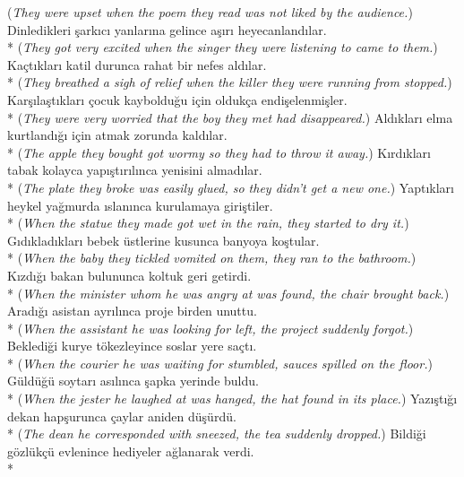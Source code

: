 ({\it They were upset when the poem they read was not liked by the audience.})
\ex Dinledikleri \c{s}ark{\i}c{\i} yanlar{\i}na gelince a\c{s}{\i}r{\i} heyecanland{\i}lar. \\*
({\it They got very excited when the singer they were listening to came to them.})
\ex Ka\c{c}t{\i}klar{\i} katil durunca rahat bir nefes ald{\i}lar. \\*
({\it They breathed a sigh of relief when the killer they were running from stopped.})
\ex Kar\c{s}{\i}la\c{s}t{\i}klar{\i} \c{c}ocuk kayboldu\u{g}u i\c{c}in olduk\c{c}a endi\c{s}elenmi\c{s}ler. \\*
({\it They were very worried that the boy they met had disappeared.})
\ex Ald{\i}klar{\i} elma kurtland{\i}\u{g}{\i} i\c{c}in atmak zorunda kald{\i}lar. \\*
({\it The apple they bought got wormy so they had to throw it away.})
\ex K{\i}rd{\i}klar{\i} tabak kolayca yap{\i}\c{s}t{\i}r{\i}l{\i}nca yenisini almad{\i}lar. \\*
({\it The plate they broke was easily glued, so they didn't get a new one.})
\ex Yapt{\i}klar{\i} heykel ya\u{g}murda {\i}slan{\i}nca kurulamaya giri\c{s}tiler. \\*
({\it When the statue they made got wet in the rain, they started to dry it.})
\ex G{\i}d{\i}klad{\i}klar{\i} bebek \"{u}stlerine kusunca banyoya ko\c{s}tular. \\*
({\it When the baby they tickled vomited on them, they ran to the bathroom.})
\z
{}
\ea * K{\i}zd{\i}\u{g}{\i} bakan bulununca koltuk geri getirdi. \\*
({\it * When the minister whom he was angry at was found, the chair brought back.})
\ex * Arad{\i}\u{g}{\i} asistan ayr{\i}l{\i}nca proje birden unuttu. \\*
({\it * When the assistant he was looking for left, the project suddenly forgot.})
\ex * Bekledi\u{g}i kurye t\"{o}kezleyince soslar yere sa\c{c}t{\i}. \\*
({\it * When the courier he was waiting for stumbled, sauces spilled on the floor.})
\ex * G\"{u}ld\"{u}\u{g}\"{u} soytar{\i} as{\i}l{\i}nca \c{s}apka yerinde buldu. \\*
({\it * When the jester he laughed at was hanged, the hat found in its place.})
\ex * Yaz{\i}\c{s}t{\i}\u{g}{\i} dekan hap\c{s}urunca \c{c}aylar aniden d\"{u}\c{s}\"{u}rd\"{u}. \\*
({\it * The dean he corresponded with sneezed, the tea suddenly dropped.})
\ex * Bildi\u{g}i g\"{o}zl\"{u}k\c{c}\"{u} evlenince hediyeler a\u{g}lanarak verdi. \\*
